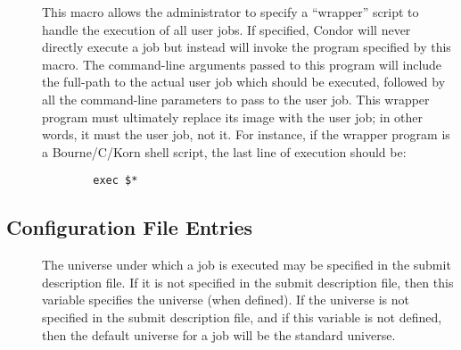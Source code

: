 \begin{description}
\item[] \label{param:UserJobWrapper} This macro
  allows the administrator to specify a ``wrapper'' script to handle the
  execution of all user jobs.  
  If specified, Condor will never directly execute a job but instead will
  invoke the program specified by this macro.
  The command-line arguments passed to this program will include the
  full-path to the actual user job which should be executed, followed by all
  the command-line parameters to pass to the user job.
  This wrapper program must ultimately replace its image with the user job;
  in other words, it must  the user job, not  it.
  For instance, if the wrapper program is a Bourne/C/Korn shell script, the
  last line of execution should be:
\begin{verbatim}
        exec $*
\end{verbatim}

\end{description}

\subsection{\label{sec:Submit-Config-File-Entries}
 Configuration File Entries}
\begin{description}
\item[] \label{param:DefaultUniverse}
The universe under which a job is executed may be specified in the submit
description file.
If it is not specified in the submit description file, then
this variable specifies the universe (when defined).
If the universe is not specified in the submit description
file, and if this variable is not defined, then
the default universe for a job will be the standard universe.
\end{description}

